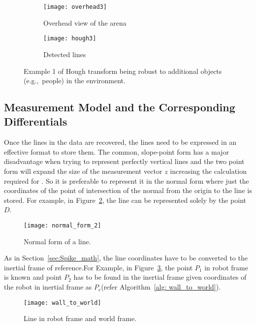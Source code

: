   \begin{figure}[h!]
      \centering
      \begin{subfigure}[b]{0.45\textwidth}
      
  	    \texttt{[image: overhead3]}
          \caption{Overhead view of the arena}
      \end{subfigure}
      \quad %
      \begin{subfigure}[b]{0.45\textwidth}
          \texttt{[image: hough3]}
 		 \caption{Detected lines}
      \end{subfigure}%
          \caption{Example 1 of Hough transform being robust to additional objects (e.g.,\ people) in the environment.}
          \label{fig: hough3}
  \end{figure}
 
\subsection{Measurement Model and the Corresponding Differentials}
\label{sec:linear_math}
Once the lines in the data are recovered, the lines need to be expressed in an effective format to store them. The common, slope-point form has a major disadvantage when trying to represent perfectly vertical lines and the two point form will expand the size of the measurement vector $ z $ increasing the calculation required for \ekf. So it is preferable to represent it in the normal form where just the coordinates of the point of intersection of the normal from the origin to the line is stored. For example, in Figure~\ref{fig: normal_form}, the line can be represented solely by the point $ D $.

\begin{figure}
\centering
\texttt{[image: normal\_form\_2]}
\caption{Normal form of a line.}
\label{fig: normal_form}
\end{figure}

As in Section~\ref{sec:Spike_math}, the line coordinates have to be converted to the inertial frame of reference.For Example, in Figure~\ref{fig: wall_to_world}, the point $ P_1 $ in robot frame is known and point $ P_2 $ has to be found in the inertial frame given coordinates of the robot in inertial frame as $ P_r $(refer Algorithm~\ref{alg: wall_to_world}).
\begin{figure}
\centering
\texttt{[image: wall\_to\_world]}
\caption{Line in robot frame and world frame.}
\label{fig: wall_to_world}
\end{figure}

